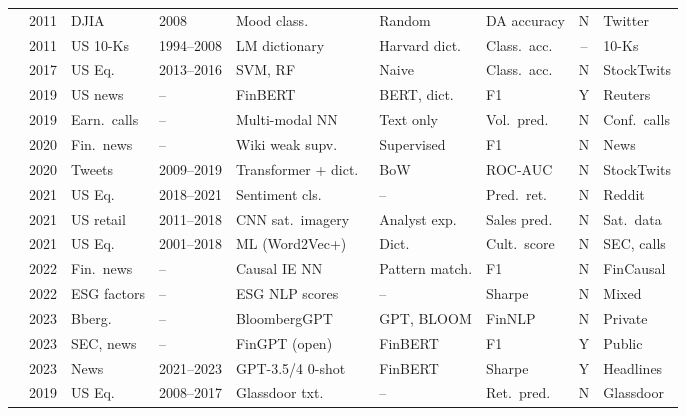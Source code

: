 \begin{longtable}{@{}p{2.4cm} c p{1.0cm} p{1.0cm} p{2.0cm} p{1.9cm} p{1.4cm} c p{1.4cm}@{}}
\citet{Bollen2011}     & 2011 & DJIA      & 2008       & Mood class.\        & Random         & DA accuracy   & N & Twitter \\
\citet{Loughran2011}   & 2011 & US 10-Ks  & 1994--2008 & LM dictionary       & Harvard dict.\ & Class.\ acc.\ & -- & 10-Ks  \\
\citet{Oliveira2017}   & 2017 & US Eq.\   & 2013--2016 & SVM, RF             & Naive          & Class.\ acc.\ & N & StockTwits \\
\citet{Araci2019}      & 2019 & US news   & --         & FinBERT             & BERT, dict.\   & F1            & Y & Reuters \\
\citet{Qin2019}        & 2019 & Earn.\ calls & --      & Multi-modal NN      & Text only      & Vol.\ pred.\  & N & Conf.\ calls \\
\citet{EinDor2020}     & 2020 & Fin.\ news & --        & Wiki weak supv.\    & Supervised     & F1            & N & News    \\
\citet{Renault2020}    & 2020 & Tweets    & 2009--2019 & Transformer + dict.\ & BoW           & ROC-AUC       & N & StockTwits \\
\citet{Bradley2021}    & 2021 & US Eq.\   & 2018--2021 & Sentiment cls.\     & --             & Pred.\ ret.\  & N & Reddit  \\
\citet{Katona2021}     & 2021 & US retail & 2011--2018 & CNN sat.\ imagery   & Analyst exp.\  & Sales pred.\  & N & Sat.\ data \\
\citet{Li2021}         & 2021 & US Eq.\   & 2001--2018 & ML (Word2Vec+)      & Dict.\         & Cult.\ score  & N & SEC, calls \\
\citet{Mariko2022}     & 2022 & Fin.\ news & --        & Causal IE NN        & Pattern match. & F1            & N & FinCausal \\
\citet{Kalesnik2022}   & 2022 & ESG factors & --       & ESG NLP scores      & --             & Sharpe        & N & Mixed   \\
\citet{Wu2023}         & 2023 & Bberg.\   & --         & BloombergGPT     & GPT, BLOOM     & FinNLP        & N & Private \\
\citet{Yang2023}       & 2023 & SEC, news & --         & FinGPT (open)       & FinBERT        & F1            & Y & Public  \\
\citet{LopezLira2023}  & 2023 & News      & 2021--2023 & GPT-3.5/4 0-shot    & FinBERT        & Sharpe        & Y & Headlines \\
\citet{Green2019}      & 2019 & US Eq.\   & 2008--2017 & Glassdoor txt.\     & --             & Ret.\ pred.\  & N & Glassdoor \\

\end{longtable}

